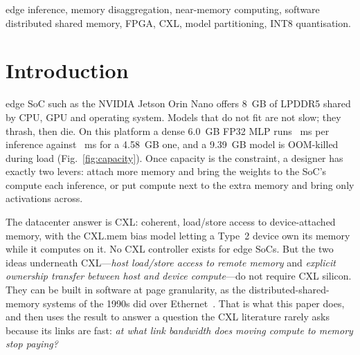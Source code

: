\documentclass[lettersize,journal]{IEEEtran}
\begin{document}
\begin{IEEEkeywords}
edge inference, memory disaggregation, near-memory computing, software distributed shared memory, FPGA, CXL, model partitioning, INT8 quantisation.
\end{IEEEkeywords}

\section{Introduction}
 edge SoC such as the NVIDIA Jetson Orin Nano offers 8~GB of LPDDR5 shared by CPU, GPU and operating system. Models that do not fit are not slow; they thrash, then die. On this platform a dense 6.0~GB FP32 MLP runs \MCapsixpzerozeroLat~ms per inference against \MCapfourpfiveeightLat~ms for a 4.58~GB one, and a 9.39~GB model is OOM-killed during load (Fig.~\ref{fig:capacity}). Once capacity is the constraint, a designer has exactly two levers: attach more memory and bring the weights to the SoC's compute each inference, or put compute next to the extra memory and bring only activations across.

The datacenter answer is CXL: coherent, load/store access to device-attached memory, with the CXL.mem bias model letting a Type~2 device own its memory while it computes on it. No CXL controller exists for edge SoCs. But the two ideas underneath CXL---\emph{host load/store access to remote memory} and \emph{explicit ownership transfer between host and device compute}---do not require CXL silicon. They can be built in software at page granularity, as the distributed-shared-memory systems of the 1990s did over Ethernet~\cite{ivy,treadmarks,munin}. That is what this paper does, and then uses the result to answer a question the CXL literature rarely asks because its links are fast: \emph{at what link bandwidth does moving compute to memory stop paying?}
\end{document}
